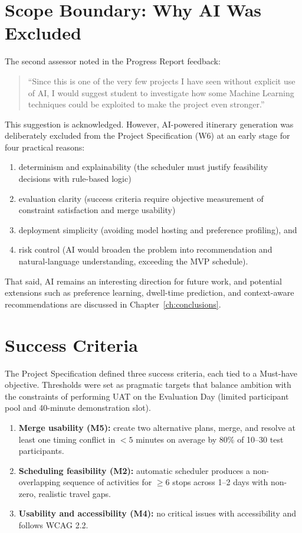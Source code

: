 \section{Scope Boundary: Why AI Was Excluded}
\label{sec:ai_scope}
The second assessor noted in the Progress Report feedback:
\begin{quote}
``Since this is one of the very few projects I have seen without explicit use of AI, I would suggest student to investigate how some Machine Learning techniques could be exploited to make the project even stronger.''
\end{quote}
This suggestion is acknowledged. However, AI-powered itinerary generation was deliberately excluded from the Project Specification (W6) at an early stage for four practical reasons:
\begin{enumerate}
    \item determinism and explainability (the scheduler must justify feasibility decisions with rule-based logic)
    \item evaluation clarity (success criteria require objective
    measurement of constraint satisfaction and merge usability)
    \item deployment simplicity (avoiding model hosting and preference profiling), and 
    \item risk control (AI would broaden the problem into recommendation and
    natural-language understanding, exceeding the MVP schedule).
\end{enumerate}

That said, AI remains an interesting direction for future work, and potential extensions such as preference learning, dwell-time prediction, and context-aware recommendations are discussed in Chapter~\ref{ch:conclusions}.

\section{Success Criteria}
The Project Specification defined three success criteria, each tied to a Must-have objective. Thresholds were set as pragmatic targets that balance ambition with the constraints of performing UAT on the Evaluation Day (limited participant pool and 40-minute demonstration slot).

\begin{enumerate}[label=\textbf{SC\arabic*}]
  \item \textbf{Merge usability (M5):} create two alternative plans, merge, and resolve at least one timing conflict in $<5$ minutes on average by 80\% of 10--30 test participants.
  \item \textbf{Scheduling feasibility (M2):} automatic scheduler produces a non-overlapping sequence of activities for $\ge 6$ stops across 1--2 days with non-zero, realistic travel gaps.
  \item \textbf{Usability and accessibility (M4):} no critical issues with accessibility and follows WCAG 2.2.
\end{enumerate}

